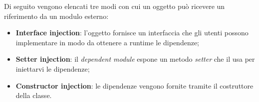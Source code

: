 Di seguito vengono elencati tre modi con cui un oggetto può ricevere un riferimento da un modulo esterno:

\begin{itemize}

	\item \textbf{Interface injection}: l'oggetto fornisce un interfaccia che gli utenti possono implementare in modo da ottenere a runtime le dipendenze;
	\item \textbf{Setter injection}: il \textit{dependent module} espone un metodo \textit{setter} che il  usa per iniettarvi le dipendenze;
	\item \textbf{Constructor injection}: le dipendenze vengono fornite tramite il costruttore della classe.

\end{itemize}



